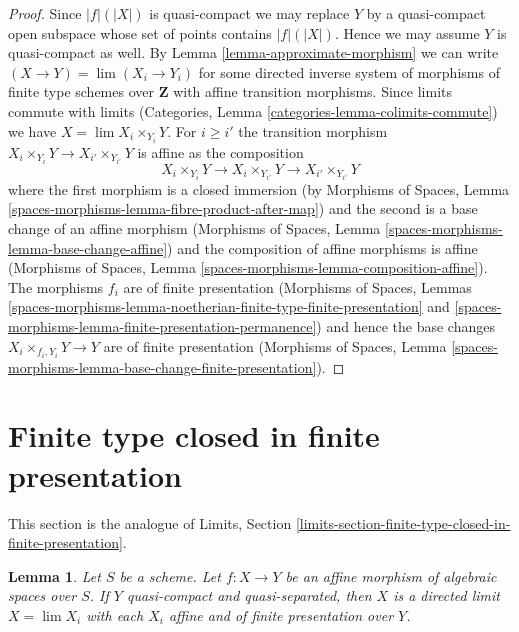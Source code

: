 \documentclass{stacks-project}
\theoremstyle{plain}
\newtheorem{lemma}[subsection]{Lemma}
\theoremstyle{definition}
\theoremstyle{remark}
\numberwithin{equation}{subsection}
\def\lim{\mathop{\mathrm{lim}}\nolimits}
\begin{document}
\begin{proof}
Since $|f|(|X|)$ is quasi-compact we may replace $Y$ by a quasi-compact
open subspace whose set of points contains $|f|(|X|)$. Hence we may assume
$Y$ is quasi-compact as well.
By Lemma \ref{lemma-approximate-morphism} we can write
$(X \to Y) = \lim (X_i \to Y_i)$ for some directed inverse system
of morphisms of finite type schemes over $\mathbf{Z}$ with
affine transition morphisms. Since limits commute with limits
(Categories, Lemma \ref{categories-lemma-colimits-commute})
we have $X = \lim X_i \times_{Y_i} Y$. For $i \geq i'$
the transition morphism
$X_i \times_{Y_i} Y \to X_{i'} \times_{Y_{i'}} Y$ is affine as
the composition
$$
X_i \times_{Y_i} Y \to X_i \times_{Y_{i'}} Y \to X_{i'} \times_{Y_{i'}} Y
$$
where the first morphism is a closed immersion (by
Morphisms of Spaces, Lemma
\ref{spaces-morphisms-lemma-fibre-product-after-map})
and the second is a base change of an affine morphism
(Morphisms of Spaces, Lemma \ref{spaces-morphisms-lemma-base-change-affine})
and the composition of affine morphisms is affine
(Morphisms of Spaces, Lemma \ref{spaces-morphisms-lemma-composition-affine}).
The morphisms $f_i$ are of finite presentation
(Morphisms of Spaces, Lemmas
\ref{spaces-morphisms-lemma-noetherian-finite-type-finite-presentation} and
\ref{spaces-morphisms-lemma-finite-presentation-permanence})
and hence the base changes $X_i \times_{f_i, Y_i} Y \to Y$
are of finite presentation
(Morphisms of Spaces, Lemma
\ref{spaces-morphisms-lemma-base-change-finite-presentation}).
\end{proof}






\section{Finite type closed in finite presentation}
\label{section-finite-type-closed-in-finite-presentation}

\noindent
This section is the analogue of
Limits, Section \ref{limits-section-finite-type-closed-in-finite-presentation}.

\begin{lemma}
\label{lemma-affine-morphism-is-limit}
Let $S$ be a scheme. Let $f : X \to Y$ be an affine morphism of algebraic
spaces over $S$. If $Y$ quasi-compact and
quasi-separated, then $X$ is a directed limit $X = \lim X_i$
with each $X_i$ affine and of finite presentation over $Y$.
\end{lemma}
\end{document}
